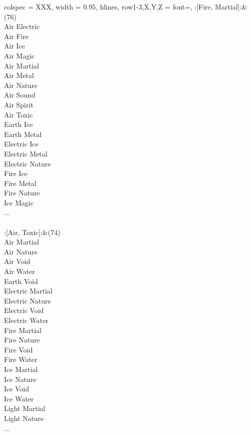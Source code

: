 \begin{longtblr}[
	caption = {2v2 Attacking Effective},
	label = {2v2-Attacking-Effective},
]{
	colspec = {XXX}, width = 0.95\linewidth,
	hlines,
	row{1-3,X,Y,Z} = {font=\bfseries},
}
	:[Fire, Martial]:&{(76)\\
	Air Electric \\
	Air Fire \\
	Air Ice \\
	Air Magic \\
	Air Martial \\
	Air Metal \\
	Air Nature \\
	Air Sound \\
	Air Spirit \\
	Air Toxic \\
	Earth Ice \\
	Earth Metal \\
	Electric Ice \\
	Electric Metal \\
	Electric Nature \\
	Fire Ice \\
	Fire Metal \\
	Fire Nature \\
	Ice Magic \\
	...\\
	}\\

	:[Air, Toxic]:&{(74)\\
	Air Martial \\
	Air Nature \\
	Air Void \\
	Air Water \\
	Earth Void \\
	Electric Martial \\
	Electric Nature \\
	Electric Void \\
	Electric Water \\
	Fire Martial \\
	Fire Nature \\
	Fire Void \\
	Fire Water \\
	Ice Martial \\
	Ice Nature \\
	Ice Void \\
	Ice Water \\
	Light Martial \\
	Light Nature \\
	...\\
	}\\


\end{longtblr}

